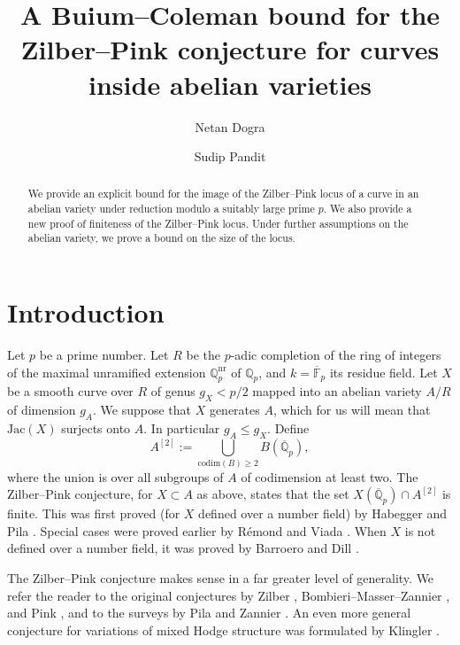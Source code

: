 \documentclass[11pt]{amsart}
\def\Q{\mathbb Q}
\theoremstyle{plain}
\theoremstyle{definition}
\newcommand{\F}{\mathbb{F}}
\newcommand{\Jac}{\mathrm{Jac}}
\begin{document}
\title{A Buium--Coleman bound for the Zilber--Pink conjecture for curves inside abelian varieties}
\author[N. Dogra]{Netan Dogra}
\author[S. Pandit]{Sudip Pandit}
\maketitle

\begin{abstract} 
We provide an explicit bound for the image of the Zilber--Pink locus of a curve in an abelian variety under reduction modulo a suitably large prime $p$. We also provide a new proof of finiteness of the Zilber--Pink locus. Under further assumptions on the abelian variety, we prove a bound on the size of the locus.
\end{abstract}
\pagestyle{headings}
\tableofcontents


\section{Introduction}
Let $p$ be a prime number. Let $R$ be the $p$-adic completion of the ring of integers of the maximal unramified extension $\Q _p ^{\mathrm{nr}}$ of $\Q _p $, and $k=\overline{\F }_p $ its residue field. Let $X$ be a smooth curve over $R$ of genus $g_X <p/2$ mapped into an abelian variety $A/R$ of dimension $g_A$. We suppose that $X$ generates $A$, which for us will mean that $\Jac (X)$ surjects onto $A$. In particular $g_A \leq g_X$.
Define 
\[
A^{[2]}:=\bigcup_{\mathrm{codim} (B)\geq 2} B(\overline{\Q }_p ),
\]
where the union is over all subgroups of $A$ of codimension at least two.  The Zilber--Pink conjecture, for $X\subset A$ as above, states that the set $X(\overline{\mathbb{\Q }}_p )\cap A^{[2]}$ is finite. This was first proved (for $X$ defined over a number field) by Habegger and Pila \cite{HP}. Special cases were proved earlier by R\'emond \cite{rem3} and Viada \cite{viada1} \cite{viada2}. When $X$ is not defined over a number field, it was proved by Barroero and Dill \cite{BD}. 

The Zilber--Pink conjecture makes sense in a far greater level of generality. We refer the reader to the original conjectures by Zilber \cite{zilber}, Bombieri--Masser--Zannier \cite{BMZ}, and Pink \cite{pink}, and to the surveys by Pila \cite{pila} and Zannier \cite{zannier}. An even more general conjecture for variations of mixed Hodge structure was formulated by Klingler \cite{klingler}.
\end{document}
